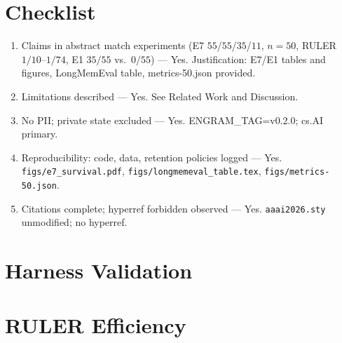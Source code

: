 \documentclass[letterpaper]{article}
\begin{document}


\section*{Checklist}
\begin{enumerate}
\item Claims in abstract match experiments (E7 $55$/$55$/$35$/$11$, $n{=}50$, RULER $1/10$--$1/74$, E1 $35/55$ vs.\ $0/55$) --- Yes. Justification: E7/E1 tables and figures, LongMemEval table, metrics-50.json provided.
\item Limitations described --- Yes. See Related Work and Discussion.
\item No PII; private state excluded --- Yes. ENGRAM\_TAG=v0.2.0; cs.AI primary.
\item Reproducibility: code, data, retention policies logged --- Yes. \texttt{figs/e7\_survival.pdf}, \texttt{figs/longmemeval\_table.tex}, \texttt{figs/metrics-50.json}.
\item Citations complete; hyperref forbidden observed --- Yes. \texttt{aaai2026.sty} unmodified; no hyperref.
\end{enumerate}

\appendix
\section{Harness Validation}\label{app:harness}

\section{RULER Efficiency}\label{app:ruler}

\end{document}
